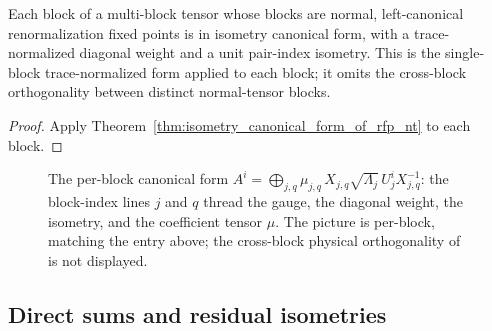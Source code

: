 \begin{theorem}%
    \label{thm:isometry_canonical_form_of_rfp_nt_blocks}
    \leanok
    Each block of a multi-block tensor whose blocks are normal, left-canonical
    renormalization fixed points is in isometry canonical form, with a
    trace-normalized diagonal weight and a unit pair-index isometry.  This is
    the single-block trace-normalized form applied to each block; it omits the
    cross-block orthogonality between distinct normal-tensor blocks.
\end{theorem}
\begin{proof}\leanok
    Apply Theorem~\ref{thm:isometry_canonical_form_of_rfp_nt} to each block.
\end{proof}

\begin{figure}[ht]
    \centering
    \TNRFPIsometryCanonicalFormBlocks
    \caption{The per-block canonical form
        $A^i=\bigoplus_{j,q}\mu_{j,q}\,X_{j,q}\sqrt{\Lambda_j}\,U_j^i
            X_{j,q}^{-1}$: the block-index lines $j$ and $q$ thread the gauge,
        the diagonal weight, the isometry, and the coefficient tensor $\mu$.
        The picture is per-block, matching the entry above; the cross-block
        physical orthogonality of
        \cite[Section~3.4, lines~543--561]{Cirac2016MPDO_arXiv} is not
        displayed.}
    \label{fig:rfp_isometry_canonical_form_blocks}
\end{figure}

\subsection{Direct sums and residual isometries}


